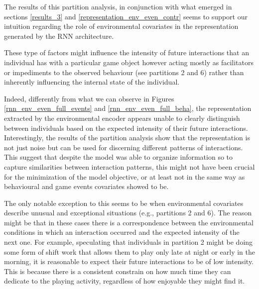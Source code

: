 The results of this partition analysis, in conjunction with what emerged in sections \ref{results_3} and \ref{representation_env_even_contr} seems to support our intuition regarding the role of environmental covariates in the representation generated by the RNN architecture. 

These type of factors might influence the intensity of future interactions that an individual has with a particular game object however acting mostly as facilitators or impediments to the observed behaviour (see partitions 2 and 6) rather than inherently influencing the internal state of the individual. 

Indeed, differently from what we can observe in Figures \ref{rnn_env_even_full_events} and \ref{rnn_env_even_full_beha}, the representation extracted by the environmental encoder appears unable to clearly distinguish between individuals based on the expected intensity of their future interactions. Interestingly, the results of the partition analysis show that the representation is not just noise but can be used for discerning different patterns of interactions. This suggest that despite the model was able to organize information so to capture similarities between interaction patterns, this might not have been crucial for the minimization of the model objective, or at least not in the same way as behavioural and game events covariates showed to be.

The only notable exception to this seems to be when environmental covariates describe unusual and exceptional situations (e.g., partitions 2 and 6). The reason might be that in these cases there is a correspondence between the environmental conditions in which an interaction occurred and the expected intensity of the next one. For example, speculating that individuals in partition 2 might be doing some form of shift work that allows them to play only late at night or early in the morning, it is reasonable to expect their future interactions to be of low intensity. This is because there is a consistent constrain on how much time they can dedicate to the playing activity, regardless of how enjoyable they might find it.

